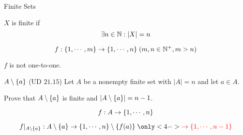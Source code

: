 \begin{frame}{}
  \centerline{\LARGE Finite Sets}

  \vspace{0.50cm}

  \pause
  \begin{quote}
    \begin{center}
      {\large {}}
    \end{center}
  \end{quote}
\end{frame}


\begin{frame}{}
  \begin{definition}[Finite]
    $X$ is finite if
    \[
      \exists n \in \mathbb{N}: |X| = n
    \]
  \end{definition}

  \pause
  \vspace{0.60cm}
  \begin{theorem}
    \[
      f: \{1, \cdots, m\} \to \{1, \cdots, n\} \; (m,n \in \mathbb{N}^{+}, m > n)
    \]

    $f$ is not one-to-one.
  \end{theorem}
\end{frame}

\begin{frame}{}
  \begin{exampleblock}{$A \setminus \{a\}$ (UD $21.15$)}
    Let $A$ be a nonempty finite set with $|A| = n$ and let $a \in A$.

    Prove that $A \setminus \{a\}$ is finite and $|A \setminus \{a\}| = n - 1$.
  \end{exampleblock}

  \pause
  \[
    f: A \to \{1, \cdots, n\}
  \]

  \pause
  \[
    f|_{A \setminus \set{a}}: A \setminus \set{a} \to \set{1, \cdots, n} \setminus \set{f(a)} \;\only<4->{\red{\to \set{1, \cdots, n - 1}}}
  \]
\end{frame}

